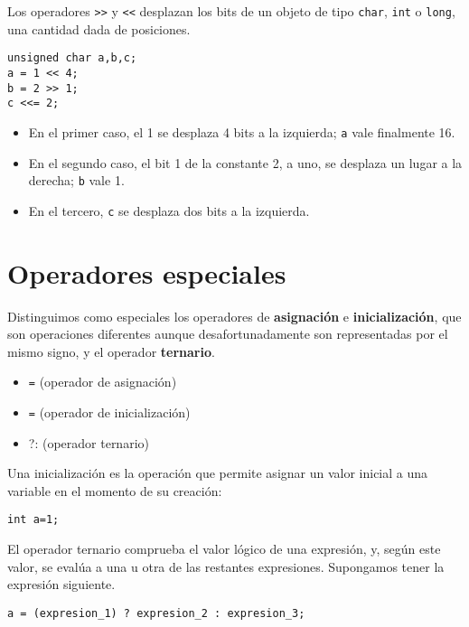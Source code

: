 \begin{ejemplo}
Los operadores \lstinline{>>} y \lstinline{<<} desplazan los bits de un objeto de tipo \lstinline{char}, \lstinline{int} o \lstinline{long}, una cantidad dada de posiciones. 
\begin{lstlisting}
unsigned char a,b,c;
a = 1 << 4;
b = 2 >> 1;
c <<= 2;    
\end{lstlisting}
\begin{itemize}
	\item En el primer caso, el 1 se desplaza 4 bits a la izquierda; \lstinline{a} vale finalmente 16. 
	\item En el segundo caso, el bit 1 de la constante 2, a uno, se desplaza un lugar a la derecha; \lstinline{b} vale 1. 
	\item En el tercero, \lstinline{c} se desplaza dos bits a la izquierda. 
\end{itemize}
\end{ejemplo}


\section{Operadores especiales}

Distinguimos como especiales los operadores de \textbf{asignación} e \textbf{inicialización}, que son operaciones diferentes aunque desafortunadamente son representadas por el mismo signo, y el operador \textbf{ternario}.

\begin{itemize}
	\item \lstinline{=} (operador de asignación)
	\item \lstinline{=} (operador de inicialización)
	\item ?: (operador ternario)
\end{itemize}



Una inicialización es la operación que permite asignar un valor inicial a una variable en el momento de su creación: 
\begin{lstlisting}
int a=1;
\end{lstlisting}

El operador ternario comprueba el valor lógico de una expresión, y, según este valor, se evalúa a una u otra de las restantes expresiones. Supongamos tener la expresión siguiente.

\begin{lstlisting}
a = (expresion_1) ? expresion_2 : expresion_3;    
\end{lstlisting}

